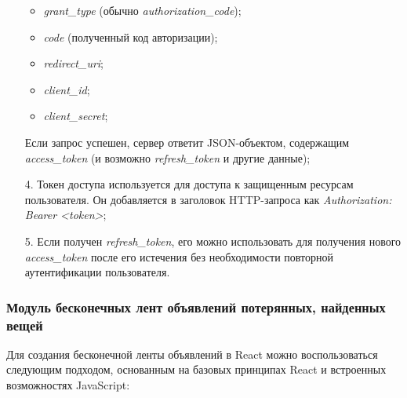\begin{enumerate}[wide=0pt]
	\begin{itemize}[wide=0pt]
		\item \textit{grant\_type} (обычно \textit{authorization\_code});
		\item \textit{code} (полученный код авторизации);
		\item \textit{redirect\_uri};
		\item \textit{client\_id};
		\item \textit{client\_secret};
		
	\end{itemize}
	
	Если запрос успешен, сервер ответит JSON-объектом, содержащим \textit{access\_token} (и возможно \textit{refresh\_token} и другие данные);
	
	\item[4.] Токен доступа используется для доступа к защищенным ресурсам пользователя. Он добавляется в заголовок HTTP-запроса как \textit{Authorization: Bearer <token>};
	
	\item[5.] Если получен \textit{refresh\_token}, его можно использовать для получения нового \textit{access\_token} после его истечения без необходимости повторной аутентификации пользователя.
	
\end{enumerate}


\subsubsection[Модуль\hspace*{10pt}бесконечных\hspace*{10pt}лент\hspace*{10pt}объявлений\hspace*{10pt}потерянных,\hspace*{10pt}найденных вещей]{Модуль бесконечных лент объявлений потерянных, найденных вещей}

Для создания бесконечной ленты объявлений в React можно воспользоваться следующим подходом, основанным на базовых принципах React и встроенных возможностях JavaScript:

